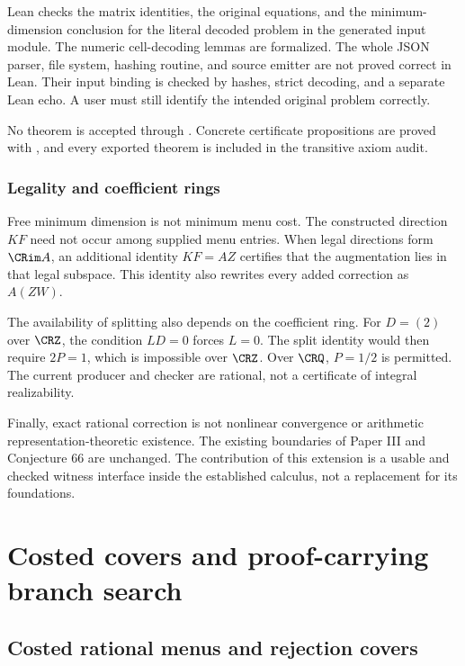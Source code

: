 \begin{scopebox}[title=The precise trust boundary]
Lean checks the matrix identities, the original equations, and the minimum-dimension conclusion for the literal decoded problem in the generated input module. The numeric cell-decoding lemmas are formalized. The whole JSON parser, file system, hashing routine, and source emitter are not proved correct in Lean. Their input binding is checked by hashes, strict decoding, and a separate Lean echo. A user must still identify the intended original problem correctly.

No theorem is accepted through . Concrete certificate propositions are proved with , and every exported theorem is included in the transitive axiom audit.
\end{scopebox}

\subsection{Legality and coefficient rings}
Free minimum dimension is not minimum menu cost. The constructed direction $KF$ need not occur among supplied menu entries. When legal directions form $\CRim A$, an additional identity $KF=AZ$ certifies that the augmentation lies in that legal subspace. This identity also rewrites every added correction as $A(ZW)$.

The availability of splitting also depends on the coefficient ring. For $D=(2)$ over $\CRZ$, the condition $LD=0$ forces $L=0$. The split identity would then require $2P=1$, which is impossible over $\CRZ$. Over $\CRQ$, $P=1/2$ is permitted. The current producer and checker are rational, not a certificate of integral realizability.

Finally, exact rational correction is not nonlinear convergence or arithmetic representation-theoretic existence. The existing boundaries of Paper III and Conjecture 66 are unchanged. The contribution of this extension is a usable and checked witness interface inside the established calculus, not a replacement for its foundations.


\chapter{Costed covers and proof-carrying branch search}\label{CR:book:chapter-58}
\section{Costed rational menus and rejection covers}\label{CR:cr-source-section-10}
\label{CR:ch:menu-covers}

